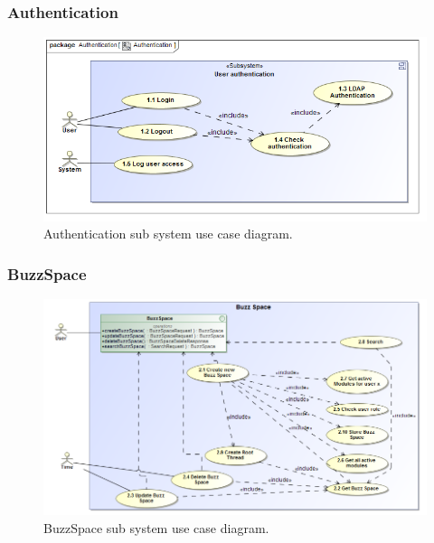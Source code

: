 \documentclass [a4paper,12pt] {article}
\begin{document}
		\subsubsection{Authentication}
			\begin{figure}[H]
				\centering
				\includegraphics[width=1.0\textwidth]{AuthenticationUC.png}
				\caption{Authentication sub system use case diagram.}
			\end{figure}
		\subsubsection{BuzzSpace}
			\begin{figure}[H]
				\centering
				\includegraphics[width=1.0\textwidth]{BuzzSpaceUC.png}
				\caption{BuzzSpace sub system use case diagram.}
			\end{figure}
\end{document}
